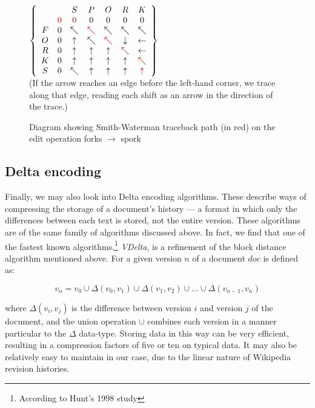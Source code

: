 \begin{figure}[h]
  \centering $\left\{
  \begin{array}{ccccccc}
    & & S & P & O & R & K \\ & \color{red}{0} & \color{red}{0} & 0 & 0
    & 0 & 0 \\ F & 0 & \nwarrow & \color{red}{\nwarrow} & \nwarrow &
    \nwarrow & \nwarrow \\ O & 0 & \uparrow & \nwarrow &
    \color{red}{\nwarrow} & \downarrow & \leftarrow \\ R & 0 &
    \uparrow & \uparrow & \uparrow & \color{red}{\nwarrow} &
    \leftarrow \\ K & 0 & \uparrow & \uparrow & \uparrow & \uparrow &
    \color{red}{\nwarrow} \\ S & 0 & \nwarrow & \uparrow & \uparrow &
    \uparrow & \color{red}{\uparrow} \\
  \end{array}\right\} $\\
  (If the arrow reaches an edge before the left-hand corner, we trace
  along that edge, reading each shift as an arrow in the direction of
  the trace.)
  \caption{Diagram showing Smith-Waterman traceback path (in red) on
    the edit operation forks $\rightarrow$ spork}
  \label{fig:smith-waterman-traceback}
\end{figure}

\subsection*{Delta encoding}
Finally, we may also look into Delta encoding algorithms. These
describe ways of compressing the storage of a document's history --- a
format in which only the differences between each text is stored, not
the entire version. These algorithms are of the same family of
algorithms discussed above. In fact, we find that one of the fastest
known algorithms,\footnote{According to Hunt's 1998
  study\cite{Hunt1998}} \textit{VDelta}, is a refinement of the block
distance algorithm mentioned above. For a given version $n$ of a
document $doc$ is defined as:

$$v_n = v_0 \cup {\Delta}(v_0,v_1) \cup {\Delta}(v_1,v_2) \cup \dots
\cup {\Delta}(v_{n-1},v_n) $$

where ${\Delta}(v_i,v_j)$ is the difference between version $i$ and
version $j$ of the document, and the union operation $\cup$ combines
each version in a manner particular to the $\Delta$ data-type. Storing
data in this way can be very efficient, resulting in a compression
factors of five or ten on typical data.\cite{Macdonald2000} It may
also be relatively easy to maintain in our case, due to the linear
nature of Wikipedia revision histories.

